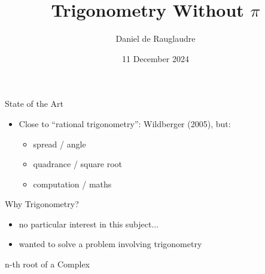 \documentclass{beamer}
\title{Trigonometry Without $\pi$}
\author{Daniel de Rauglaudre}
\date{11 December 2024}
\begin{document}
\begin{frame}
    \titlepage
\end{frame}

\begin{frame}{}
\end{frame}

\begin{frame}{State of the Art}
  \begin{itemize}
    \item Close to ``rational trigonometry'': Wildberger
      (2005), but:
      \begin{itemize}
     \item spread / angle
      \item quadrance / square root
      \item computation / maths
      \end{itemize}
  \end{itemize}
\end{frame}

\begin{frame}{Why Trigonometry?}
  \begin{itemize}
  \item no particular interest in this subject...
  \item wanted to solve a problem involving trigonometry
  \end{itemize}
\end{frame}

\begin{frame}{n-th root of a Complex}
\end{frame}
\end{document}
